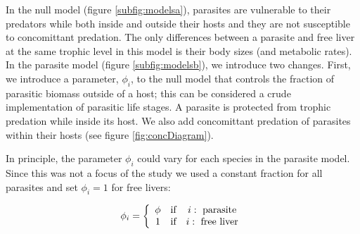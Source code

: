 \documentclass[/home/nkappler/Research/Dissertation/dissertation.tex]{subfiles}
\begin{document}
\begin{bibunit}
In the null model (figure \ref{subfig:modelsa}), parasites are vulnerable to
their predators while both inside and outside their hosts and they are not
susceptible to concomittant predation. The only differences between a parasite
and free liver at the same trophic level in this model is their body sizes (and
metabolic rates). In the parasite model (figure \ref{subfig:modelsb}), we
introduce two changes. First, we introduce a parameter, $\phi_i$, to the null
model that controls the fraction of parasitic biomass outside of a host; this
can be considered a crude implementation of parasitic life stages. A parasite
is protected from trophic predation while inside its host.  We also add
concomittant predation of parasites within their hosts (see figure
\ref{fig:concDiagram}).


In principle, the parameter $\phi_i$ could vary for each species in the  
parasite model. Since this was not a focus of the study we used a constant
fraction for all parasites and set $ \phi_i=1$ for free livers:

\begin{equation}
\phi_i = 
\left\{
\begin{array}{c c c}
\phi & \text{if} & i:\text{ parasite}\\
1 & \text{if} & i:\text{ free liver}\\
\end{array}\right.\label{eq:phi}
\end{equation}


\end{bibunit}
\end{document}
